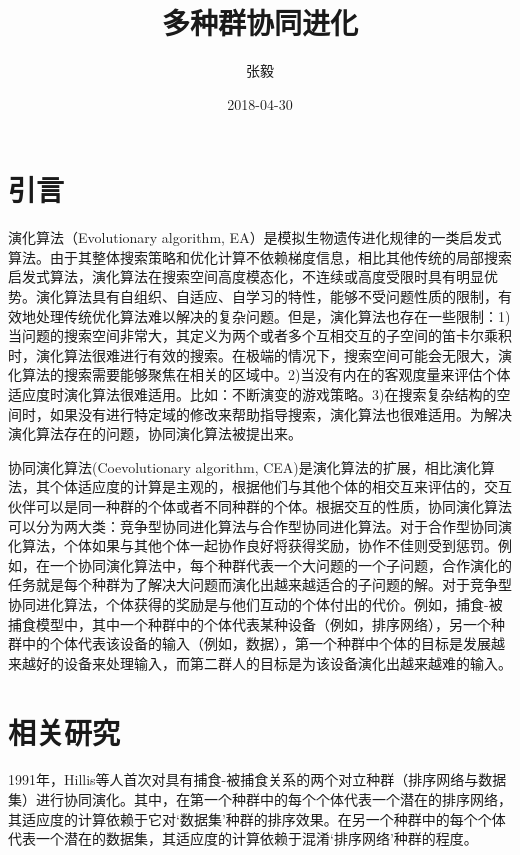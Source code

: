 \documentclass[a4paper]{article}
\title{多种群协同进化}
\date{2018-04-30}
\author{张毅}
\begin{document}
    
    \maketitle


    \newpage
    \tableofcontents
    

    \newpage
    \section{引言}

    演化算法（Evolutionary algorithm, EA）是模拟生物遗传进化规律的一类启发式算法。由于其整体搜索策略和优化计算不依赖梯度信息，相比其他传统的局部搜索启发式算法，演化算法在搜索空间高度模态化，不连续或高度受限时具有明显优势。演化算法具有自组织、自适应、自学习的特性，能够不受问题性质的限制，有效地处理传统优化算法难以解决的复杂问题\cite{sun_ea}。但是，演化算法也存在一些限制：1)当问题的搜索空间非常大，其定义为两个或者多个互相交互的子空间的笛卡尔乘积时，演化算法很难进行有效的搜索。在极端的情况下，搜索空间可能会无限大，演化算法的搜索需要能够聚焦在相关的区域中。2)当没有内在的客观度量来评估个体适应度时演化算法很难适用。比如：不断演变的游戏策略。3)在搜索复杂结构的空间时，如果没有进行特定域的修改来帮助指导搜索，演化算法也很难适用。为解决演化算法存在的问题，协同演化算法被提出来。
    
    协同演化算法(Coevolutionary algorithm, CEA)是演化算法的扩展，相比演化算法，其个体适应度的计算是主观的，根据他们与其他个体的相交互来评估的，交互伙伴可以是同一种群的个体或者不同种群的个体\cite{wiegand2003analysis}。根据交互的性质，协同演化算法可以分为两大类：竞争型协同进化算法与合作型协同进化算法。对于合作型协同演化算法，个体如果与其他个体一起协作良好将获得奖励，协作不佳则受到惩罚。例如，在一个协同演化算法中，每个种群代表一个大问题的一个子问题，合作演化的任务就是每个种群为了解决大问题而演化出越来越适合的子问题的解。对于竞争型协同进化算法，个体获得的奖励是与他们互动的个体付出的代价。例如，捕食-被捕食模型中，其中一个种群中的个体代表某种设备（例如，排序网络），另一个种群中的个体代表该设备的输入（例如，数据），第一个种群中个体的目标是发展越来越好的设备来处理输入，而第二群人的目标是为该设备演化出越来越难的输入。


    \newpage
    \section{相关研究}
    
    1991年，Hillis等人首次对具有捕食-被捕食关系的两个对立种群（排序网络与数据集）进行协同演化\cite{hillis1990co}。其中，在第一个种群中的每个个体代表一个潜在的排序网络，其适应度的计算依赖于它对‘数据集’种群的排序效果。在另一个种群中的每个个体代表一个潜在的数据集，其适应度的计算依赖于混淆‘排序网络’种群的程度。
    
\end{document}

